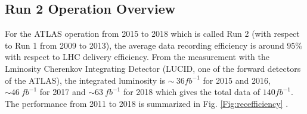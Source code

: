 \subsection{Run 2 Operation Overview}
For the ATLAS operation from 2015 to 2018 which is called Run 2 (with respect to Run 1 from 2009 to 2013), the average data recording efficiency is around $95\%$ with respect to LHC delivery efficiency. From the measurement with the Lminosity  Cherenkov  Integrating  Detector (LUCID, one of the forward detectors of the ATLAS)\cite{Bruschi:2025000, ATLAS:2019pzw}, the integrated luminosity is $\sim~36fb^{-1}$ for 2015 and 2016, $\sim46~fb^{-1}$ for 2017 and $\sim63~fb^{-1}$ for 2018 which gives the total data of $140 fb^{-1}$. The performance from 2011 to 2018 is summarized in Fig. \ref{Fig:recefficiency}
.

